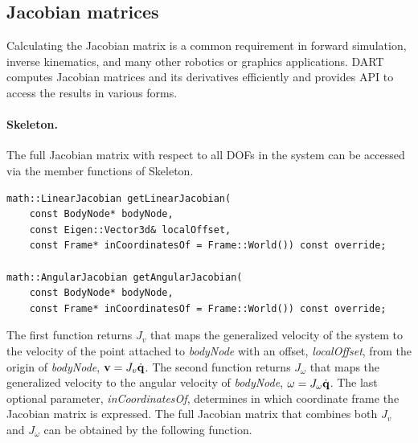 



\subsection{Jacobian matrices}
Calculating the Jacobian matrix is a common requirement in forward simulation, inverse kinematics, and many other robotics or graphics applications. DART computes Jacobian matrices and its derivatives efficiently and provides API to access the results in various forms. 

\paragraph{Skeleton.} The full Jacobian matrix with respect to all DOFs in the system can be accessed via the member functions of Skeleton.

\begin{lstlisting}[caption=Skeleton.h]
math::LinearJacobian getLinearJacobian(
    const BodyNode* bodyNode, 
    const Eigen::Vector3d& localOffset, 
    const Frame* inCoordinatesOf = Frame::World()) const override;

math::AngularJacobian getAngularJacobian(
    const BodyNode* bodyNode, 
    const Frame* inCoordinatesOf = Frame::World()) const override;
\end{lstlisting}

The first function returns $J_v$ that maps the generalized velocity of
the system to the velocity of the point attached to \emph{bodyNode}
with an offset, \emph{localOffset}, from the origin of
\emph{bodyNode}, $\mathbf{v} = J_v \dot{\mathbf{q}}$. The second function
returns $J_{\omega}$ that maps the generalized velocity to the angular
velocity of \emph{bodyNode}, $\omega = J_{\omega}\dot{\mathbf{q}}$. The
last optional parameter, \emph{inCoordinatesOf}, determines in which
coordinate frame the Jacobian matrix is expressed. The full Jacobian
matrix that combines both $J_v$ and $J_{\omega}$ can be obtained by
the following function.

